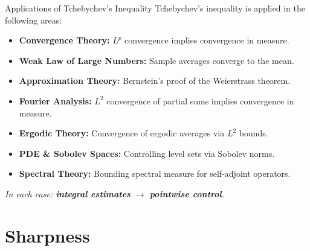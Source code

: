 \documentclass{beamer}
\begin{document}
\begin{frame}{Applications of Tchebychev's Inequality}
    Tchebychev's inequality is applied in the following areas:

    \vspace{0.2cm}
    \begin{itemize}
        \item \textbf{Convergence Theory:} $L^p$ convergence implies convergence in measure.
        \item \textbf{Weak Law of Large Numbers:} Sample averages converge to the mean.
        \item \textbf{Approximation Theory:} Bernstein's proof of the Weierstrass theorem.
        \item \textbf{Fourier Analysis:} $L^2$ convergence of partial sums implies convergence in measure.
        \item \textbf{Ergodic Theory:} Convergence of ergodic averages via $L^2$ bounds.
        \item \textbf{PDE \& Sobolev Spaces:} Controlling level sets via Sobolev norms.
        \item \textbf{Spectral Theory:} Bounding spectral measure for self-adjoint operators.
    \end{itemize}

    \vspace{0.3cm}
    \textit{In each case: \textbf{integral estimates} $\longrightarrow$ \textbf{pointwise control}.}
\end{frame}

\section{Sharpness}
\end{document}
